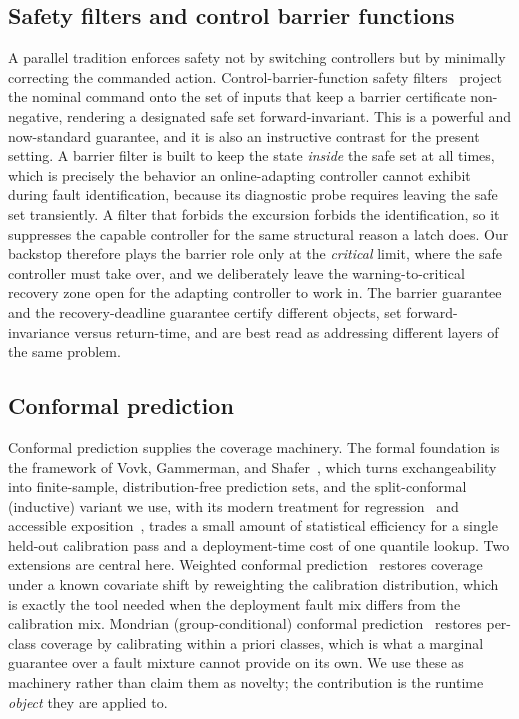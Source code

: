 \documentclass[11pt]{article}
\theoremstyle{plain}
\theoremstyle{definition}
\begin{document}
\subsection{Safety filters and control barrier functions} A parallel tradition enforces
safety not by switching controllers but by minimally correcting the commanded action.
Control-barrier-function safety filters~\cite{Ames2019} project the nominal command onto the
set of inputs that keep a barrier certificate non-negative, rendering a designated safe set
forward-invariant. This is a powerful and now-standard guarantee, and it is also an
instructive contrast for the present setting. A barrier filter is built to keep the state
\emph{inside} the safe set at all times, which is precisely the behavior an online-adapting
controller cannot exhibit during fault identification, because its diagnostic probe requires
leaving the safe set transiently. A filter that forbids the excursion forbids the
identification, so it suppresses the capable controller for the same structural reason a
latch does. Our backstop therefore plays the barrier role only at the \emph{critical} limit,
where the safe controller must take over, and we deliberately leave the warning-to-critical
recovery zone open for the adapting controller to work in. The barrier guarantee and the
recovery-deadline guarantee certify different objects, set forward-invariance versus
return-time, and are best read as addressing different layers of the same problem.

\subsection{Conformal prediction} Conformal prediction supplies the coverage machinery. The
formal foundation is the framework of Vovk, Gammerman, and Shafer~\cite{Vovk2005}, which
turns exchangeability into finite-sample, distribution-free prediction sets, and the
split-conformal (inductive) variant we use, with its modern treatment for
regression~\cite{Lei2018} and accessible exposition~\cite{Angelopoulos2023}, trades a small
amount of statistical efficiency for a single held-out calibration pass and a deployment-time
cost of one quantile lookup. Two extensions are central here. Weighted conformal
prediction~\cite{Tibshirani2019} restores coverage under a known covariate shift by
reweighting the calibration distribution, which is exactly the tool needed when the
deployment fault mix differs from the calibration mix. Mondrian (group-conditional) conformal
prediction~\cite{Vovk2005} restores per-class coverage by calibrating within a priori
classes, which is what a marginal guarantee over a fault mixture cannot provide on its own.
We use these as machinery rather than claim them as novelty; the contribution is the runtime
\emph{object} they are applied to.
\end{document}

